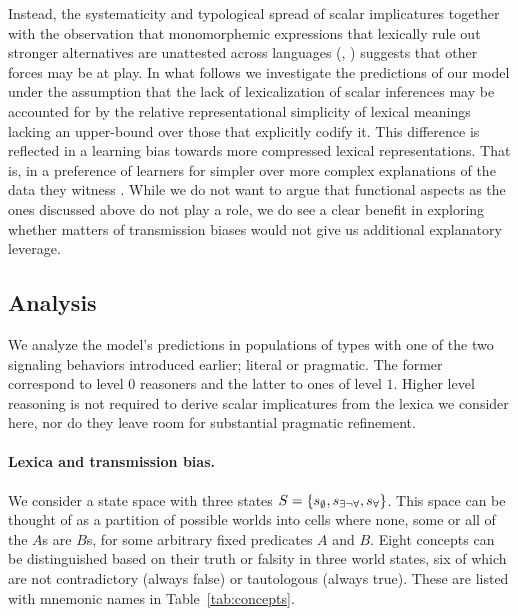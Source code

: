 \documentclass[a4paper]{article}
\newcommand{\set}[1]{\left\{#1\right\}}
\newcommand{\States}{\ensuremath{S}\xspace}		%
\newcommand{\state}{\ensuremath{s}\xspace}		%
\newcommand{\mystate}[1]{\ensuremath{\state_{\text{#1}}}\xspace} %
\newcommand{\ssome}{\mystate{\ensuremath{\exists\neg\forall}}}
\newcommand{\sall}{\mystate{\ensuremath{\forall}}}
\newcommand{\snone}{\mystate{\ensuremath{\emptyset}}}
\begin{document}
Instead, the systematicity and typological spread of scalar implicatures together with the observation that monomorphemic expressions that lexically rule out stronger alternatives are unattested across languages (\citealt[252-267]{horn:1984}, \citealt{horn:1972,traugott:2004,vdAuwera:2010}) suggests that other forces may be at play. In what follows we investigate the predictions of our model under the assumption that the lack of lexicalization of scalar inferences may be accounted for by the relative representational simplicity of lexical meanings lacking an upper-bound over those that explicitly codify it. This difference is reflected in a learning bias towards more compressed lexical representations. That is, in a preference of learners for simpler over more complex explanations of the data they witness \citep{feldman:2000, chater+vitanyi:2003, piantadosi+etal:2012a, kirby+etal:2015,piantadosi+etal:underreview}. While we do not want to argue that functional aspects as the ones discussed above do not play a role, we do see a clear benefit in exploring whether matters of transmission biases would not give us additional explanatory leverage.



\subsection{Analysis}
We analyze the model's predictions in populations of types with one of the two signaling behaviors introduced earlier; literal or pragmatic. The former correspond to level $0$ reasoners and the latter to ones of level $1$. Higher level reasoning is not required to derive scalar implicatures from the lexica we consider here, nor do they leave room for substantial pragmatic refinement.

\paragraph{Lexica and transmission bias.} We consider a state space with three states $\States = \set{\snone, \ssome, \sall}$. This space can be
thought of as a partition of possible worlds into cells where none, some or all of the $A$s are
$B$s, for some arbitrary fixed predicates $A$ and $B$. Eight concepts can be distinguished
based on their truth or falsity in three world states, six of which are not contradictory
(always false) or tautologous (always true). These are listed with mnemonic names in
Table~\ref{tab:concepts}. 
\end{document}
